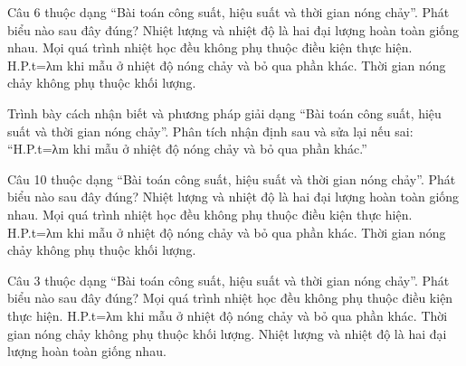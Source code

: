 \begin{ex}
Câu 6 thuộc dạng “Bài toán công suất, hiệu suất và thời gian nóng chảy”. Phát biểu nào sau đây đúng?
\choice
{Nhiệt lượng và nhiệt độ là hai đại lượng hoàn toàn giống nhau.}
{Mọi quá trình nhiệt học đều không phụ thuộc điều kiện thực hiện.}
{\True H.P.t=λm khi mẫu ở nhiệt độ nóng chảy và bỏ qua phần khác.}
{Thời gian nóng chảy không phụ thuộc khối lượng.}
\end{ex}

\begin{bt}
Trình bày cách nhận biết và phương pháp giải dạng “Bài toán công suất, hiệu suất và thời gian nóng chảy”. Phân tích nhận định sau và sửa lại nếu sai: “H.P.t=λm khi mẫu ở nhiệt độ nóng chảy và bỏ qua phần khác.”
\end{bt}

\begin{ex}
Câu 10 thuộc dạng “Bài toán công suất, hiệu suất và thời gian nóng chảy”. Phát biểu nào sau đây đúng?
\choice
{Nhiệt lượng và nhiệt độ là hai đại lượng hoàn toàn giống nhau.}
{Mọi quá trình nhiệt học đều không phụ thuộc điều kiện thực hiện.}
{\True H.P.t=λm khi mẫu ở nhiệt độ nóng chảy và bỏ qua phần khác.}
{Thời gian nóng chảy không phụ thuộc khối lượng.}
\end{ex}

\begin{ex}
Câu 3 thuộc dạng “Bài toán công suất, hiệu suất và thời gian nóng chảy”. Phát biểu nào sau đây đúng?
\choice
{Mọi quá trình nhiệt học đều không phụ thuộc điều kiện thực hiện.}
{\True H.P.t=λm khi mẫu ở nhiệt độ nóng chảy và bỏ qua phần khác.}
{Thời gian nóng chảy không phụ thuộc khối lượng.}
{Nhiệt lượng và nhiệt độ là hai đại lượng hoàn toàn giống nhau.}
\end{ex}

